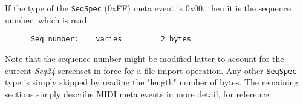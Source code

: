    If the type of the
   \texttt{SeqSpec} (0xFF) meta event is 0x00, then it is the
   sequence number, which is read:

   \begin{verbatim}
      Seq number:    varies         2 bytes
   \end{verbatim}

   Note that the sequence number might be modified latter to account for the
   current \textsl{Seq24} screenset in force for a file import operation.
   Any other \texttt{SeqSpec} type is simply skipped by reading the "length"
   number of bytes.
   The remaining sections simply describe MIDI meta events in more detail, for
   reference.

